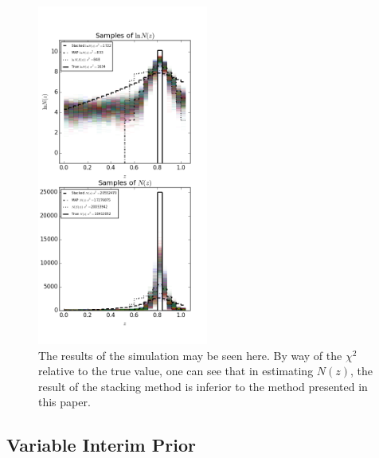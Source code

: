 \documentclass[preprint]{aastex}
\begin{document}
\begin{figure}
\includegraphics[width=0.5\textwidth]{samps-toy.png}
\caption{The results of the simulation may be seen here.  By way of the $\chi^{2}$ relative to the true value, one can see that in estimating $N(z)$, the result of the stacking method is inferior to the method presented in this paper.}
\label{fig:dumbestparam}
\end{figure}



\clearpage
\subsection{Variable Interim Prior}
\label{sec:interim}
\end{document}
